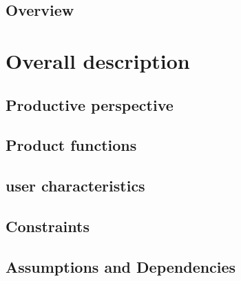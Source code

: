 \documentclass[11pt]{article}
\begin{document}
\subsection{Overview}
\section{Overall description}
\subsection{Productive perspective}
\subsection{Product functions}
\subsection{user characteristics}
\subsection{Constraints}
\subsection{Assumptions and Dependencies}
 
\end{document}
